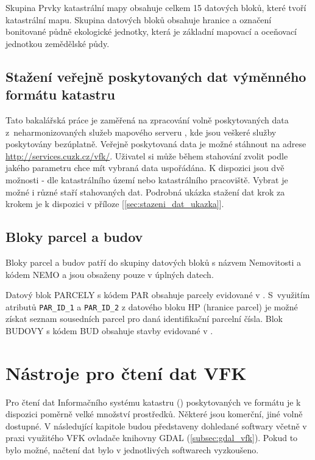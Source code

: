 Skupina Prvky katastrální mapy obsahuje celkem 15 datových bloků,
které tvoří katastrální mapu. Skupina datových bloků 
obsahuje hranice a označení bonitované půdně ekologické jednotky,
která je základní mapovací a oceňovací jednotkou zemědělské půdy.
\subsection{Stažení veřejně poskytovaných dat výměnného formátu katastru}
Tato bakalářská práce je zaměřená na zpracování volně
poskytovaných data z~neharmonizovaných služeb mapového serveru
, kde jsou veškeré služby poskytovány bezúplatně. Veřejně poskytovaná data  je
možné stáhnout na adrese \\
\href{http://services.cuzk.cz/vfk/}{http://services.cuzk.cz/vfk/}. Uživatel 
 si může během stahování zvolit podle jakého parametru chce mít vybraná data uspořádána.
 K dispozici jsou dvě možnosti - dle katastrálního území nebo katastrálního
pracoviště. Vybrat je možné i různé staří stahovaných dat.
Podrobná ukázka stažení dat krok za krokem je k dispozici v příloze [\ref{sec:stazeni_dat_ukazka}].
\subsection{Bloky parcel a budov}
\label{subsec:bloky_par_bud}
Bloky parcel a budov patří do skupiny datových bloků s názvem Nemovitosti
a kódem NEMO a jsou obsaženy pouze v úplných datech.

Datový blok PARCELY s kódem PAR obsahuje parcely evidované v
. S~využitím atributů \verb|PAR_ID_1| a \verb|PAR_ID_2| z
datového bloku HP (hranice parcel) je možné získat seznam sousedních
parcel pro daná identifikační parcelní čísla. Blok BUDOVY s kódem BUD obsahuje stavby evidované
v .
 
\section{Nástroje pro čtení dat VFK}
Pro čtení dat Informačního systému katastru () poskytovaných ve formátu  je k dispozici
poměrně velké množství prostředků. Některé jsou komerční, jiné volně
dostupné. V následující kapitole budou představeny dohledané softwary
včetně v praxi využitého VFK ovladače knihovny GDAL
(\ref{subsec:gdal_vfk}). Pokud to bylo možné, načtení dat bylo v
jednotlivých softwarech vyzkoušeno.
